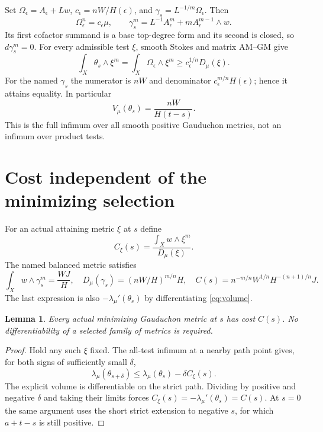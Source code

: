 \documentclass[11pt]{article}
\newtheorem{lemma}[theorem]{Lemma}
\theoremstyle{remark}\newtheorem{remark}[theorem]{Remark}
\begin{document}
Set $\Omega_\epsilon=A_\epsilon+Lw$,
$c_\epsilon=nW/H(\epsilon)$, and
$\gamma_s=L^{-1/m}\Omega_\epsilon$. Then
\[
 \Omega_\epsilon^n=c_\epsilon\mu,
 \qquad \gamma_s^m=L^{-1}A_\epsilon^m+mA_\epsilon^{m-1}\wedge w.
\]
Its first cofactor summand is a base top-degree form and its second is
closed, so $d\gamma_s^m=0$. For every admissible test $\xi$, smooth
Stokes and matrix AM--GM give
\[
 \int_X\theta_s\wedge\xi^m=\int_X\Omega_\epsilon\wedge\xi^m
 \geq c_\epsilon^{1/n}D_\mu(\xi).
\]
For the named $\gamma_s$ the numerator is $nW$ and denominator
$c_\epsilon^{m/n}H(\epsilon)$; hence it attains equality. In particular
\begin{equation}\label{eq:volume}
 V_\mu(\theta_s)=\frac{nW}{H(t-s)}.
\end{equation}
This is the full infimum over all smooth positive Gauduchon metrics,
not an infimum over product tests.

\section{Cost independent of the minimizing selection}
For an actual attaining metric $\xi$ at $s$ define
\[
 C_\xi(s)=\frac{\int_X w\wedge\xi^m}{D_\mu(\xi)}.
\]
The named balanced metric satisfies
\[
 \int_X w\wedge\gamma_s^m=\frac{WJ}{H},
 \quad D_\mu(\gamma_s)=(nW/H)^{m/n}H,
 \quad C(s)=n^{-m/n}W^{1/n}H^{-(n+1)/n}J.
\]
The last expression is also $-\lambda_\mu'(\theta_s)$ by
differentiating \eqref{eq:volume}.

\begin{lemma}\label{lem:all}
Every actual minimizing Gauduchon metric at $s$ has cost $C(s)$.
No differentiability of a selected family of metrics is required.
\end{lemma}
\begin{proof}
Hold any such $\xi$ fixed. The all-test infimum at a nearby path point
gives, for both signs of sufficiently small $\delta$,
\[
 \lambda_\mu(\theta_{s+\delta})
 \leq\lambda_\mu(\theta_s)-\delta C_\xi(s).
\]
The explicit volume is differentiable on the strict path. Dividing by
positive and negative $\delta$ and taking their limits forces
$C_\xi(s)=-\lambda_\mu'(\theta_s)=C(s)$.
At $s=0$ the same argument uses the short strict extension to negative
$s$, for which $a+t-s$ is still positive.
\end{proof}
\end{document}
